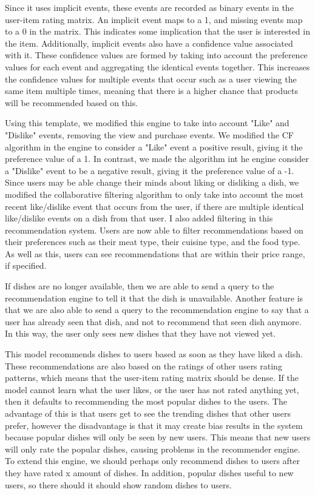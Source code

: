 Since it uses implicit events, these events are recorded as binary events in the user-item rating matrix. An implicit event maps to a 1, and missing events map to a 0 in the matrix. This indicates some implication that the user is interested in the item. Additionally, implicit events also have a confidence value associated with it. These confidence values are formed by taking into account the preference values for each event and aggregating the identical events together. This increases the confidence values for multiple events that occur such as a user viewing the same item multiple times, meaning that there is a higher chance that products will be recommended based on this. 

Using this template, we modified this engine to take into account "Like" and "Dislike" events, removing the view and purchase events. We modified the CF algorithm in the engine to consider a "Like" event a positive result, giving it the preference value of a 1. In contrast, we made the algorithm int he engine consider a "Dislike" event to be a negative result, giving it the preference value of a -1. Since users may be able change their minds about liking or disliking a dish, we modified the collaborative filtering algorithm to only take into account the most recent like/dislike event that occurs from the user, if there are multiple identical like/dislike events on a dish from that user. I also added filtering in this recommendation system. Users are now able to filter recommendations based on their preferences such as their meat type, their cuisine type, and the food type. As well as this, users can see recommendations that are within their price range, if specified. 

If dishes are no longer available, then we are able to send a query to the recommendation engine to tell it that the dish is unavailable. Another feature is that we are also able to send a query to the recommendation engine to say that a user has already seen that dish, and not to recommend that seen dish anymore. In this way, the user only sees new dishes that they have not viewed yet.


This model recommends dishes to users based as soon as they have liked a dish. These recommendations are also based on the ratings of other users rating patterns, which means that the user-item rating matrix should be dense. If the model cannot learn what the user likes, or the user has not rated anything yet, then it defaults to recommending the most popular dishes to the users. The advantage of this is that users get to see the trending dishes that other users prefer, however the disadvantage is that it may create bias results in the system because popular dishes will only be seen by new users. This means that new users will only rate the popular dishes, causing problems in the recommender engine. To extend this engine, we should perhaps only recommend dishes to users after they have rated x amount of dishes. In addition, popular dishes useful to new users, so there should it should show random dishes to users. 

\